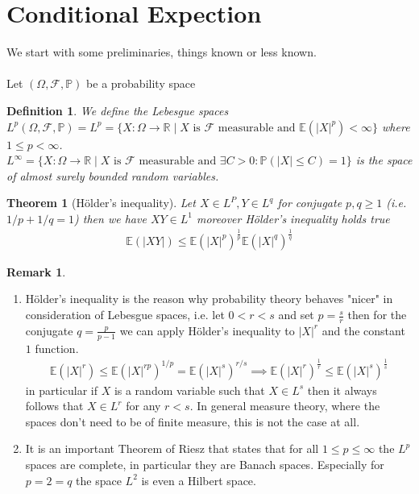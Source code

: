 \documentclass[11pt,a4paper, final]{article}
\newtheorem{thm}{Theorem}[section]
\newtheorem{defn}{Definition}[section]
\theoremstyle{definition}
\newtheorem{rem}{Remark}[section]
\begin{document}
\thispagestyle{empty}
\tableofcontents
\newpage
\section{Conditional Expection}
We start with some preliminaries, things known or less known.
\\\\
Let $( \Omega, \mathcal{F}, \mathbb{P})$ be a probability space
\begin{defn} We define the Lebesgue spaces \\ $L^p(\Omega, \mathcal{F}, \mathbb{P})=L^p= \lbrace X: \Omega \to \mathbb{R} \mid X \text{ is $\mathcal{F}$  measurable and } \mathbb{E}(|X|^p) < \infty \rbrace$ where $1 \leq p < \infty$. \\
$L^\infty = \lbrace X : \Omega \to \mathbb{R} \mid X \text{ is $\mathcal{F}$ measurable and } \exists C>0 : \mathbb{P}(|X| \leq C) = 1  \rbrace  $ is the space of almost surely bounded random variables. 
\end{defn}
\begin{thm}[Hölder's inequality] Let $X \in L^P, Y \in L^q$ for conjugate $p,q \geq 1$ (i.e. $1/p + 1/q = 1$) then we have $XY \in L^1$ moreover Hölder's inequality holds true
\begin{align*}
\mathbb{E}(|XY|) \leq \mathbb{E}(|X|^p)^{\frac{1}{p}} \mathbb{E}(|X|^q)^{\frac{1}{q}}
\end{align*}
\end{thm}
\begin{rem} \ \begin{enumerate}
\item Hölder's inequality is the reason why probability theory behaves "nicer" in consideration of Lebesgue spaces, i.e. let $0<r<s$ and set $p= \frac{s}{r}$ then for the conjugate $q=\frac{p}{p-1}$ we can apply Hölder's inequality to $|X|^r$ and the constant $1$ function. 
\begin{align*}
\mathbb{E}(|X|^r) \leq \mathbb{E}(|X|^{rp})^{1/p} = \mathbb{E}(|X|^s)^{r/s} \implies \mathbb{E}(|X|^r)^{\frac{1}{r}} \leq \mathbb{E}(|X|^s)^{\frac{1}{s}} 
\end{align*}
in particular if $X$ is a random variable such that $X \in L^s$ then it always follows that $X \in L^r$ for any $r <s$. In general measure theory, where the spaces don't need to be of finite measure, this is not the case at all. 
\item It is an important Theorem of Riesz that states that for all $1 \leq p \leq \infty$ the $L^p$ spaces are complete, in particular they are Banach spaces. Especially for $p=2=q$ the space $L^2$ is even a Hilbert space. 
\end{enumerate}
\end{rem}
\end{document}
